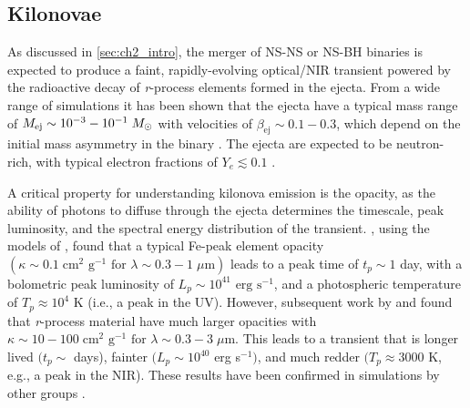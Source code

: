 \subsection{Kilonovae}
\label{sec:ch2_kilo}
As discussed in \autoref{sec:ch2_intro}, the merger of NS-NS or NS-BH binaries is expected to produce a faint, rapidly-evolving optical/NIR transient powered by the radioactive decay of {\em r}-process elements formed in the ejecta. From a wide range of simulations it has been shown that the ejecta have a typical mass range of $M_{\rm ej} \sim 10^{-3}-10^{-1} \; M_{\odot}$ with velocities of $\beta_{\text{ej}} \sim 0.1-0.3$, which depend on the initial mass asymmetry in the binary \citep{Rosswog+99,Rosswog2005,Bauswein+13a,Rosswog+13}. The ejecta are expected to be neutron-rich, with typical electron fractions of $Y_e \lesssim 0.1$ \citep{Metzger+10}.

A critical property for understanding kilonova emission is the opacity, as the ability of photons to diffuse through the ejecta determines the timescale, peak luminosity, and the spectral energy distribution of the transient. \citet{Metzger+10}, using the models of \citep[LP98 hereafter]{LP98}, found that a typical Fe-peak element opacity $(\kappa \sim 0.1 \; \text{cm}^2 \text{ g}^{-1} \text{ for } \lambda \sim 0.3 - 1\; \mu\text{m})$ leads to a peak time of $t_p \sim 1$ day, with a bolometric peak luminosity of $L_p \sim 10^{41} \text{ erg s}^{-1}$, and a photospheric temperature of $T_p \approx 10^4$ K (i.e., a peak in the UV). However, subsequent work by \citet{Kasen+13} and \citet{BarnesKasen13} found that {\em r}-process material have much larger opacities with $\kappa \sim 10-100 \; \text{cm}^2 \text{ g}^{-1} \text{ for } \lambda \sim 0.3 - 3\; \mu\text{m}$. This leads to a transient that is longer lived $(t_p \sim$ days), fainter $(L_p \sim 10^{40}$ erg s$^{-1})$, and much redder $(T_p \approx 3000$ K, e.g., a peak in the NIR). These results have been confirmed in simulations by other groups \citep[see e.g.,][]{TanakaHotokezaka13,Grossman+14,Tanaka+14}.

